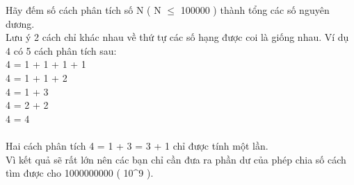 Hãy đếm số cách phân tích số N ( N $\le$ 100000 ) thành tổng các số nguyên dương.   
\\   Lưu ý 2 cách chỉ khác nhau về thứ tự các số hạng được coi là giống nhau. Ví dụ 4 có 5 cách phân tích sau:   
\\   4 = 1 + 1 + 1 + 1   
\\   4 = 1 + 1 + 2   
\\   4 = 1 + 3   
\\   4 = 2 + 2   
\\   4 = 4   
\\
\\   Hai cách phân tích 4 = 1 + 3 = 3 + 1 chỉ được tính một lần.   
\\   Vì kết quả sẽ rất lớn nên các bạn chỉ cần đưa ra phần dư của phép chia số cách tìm được cho 1000000000 ( 10^9 ).  

\